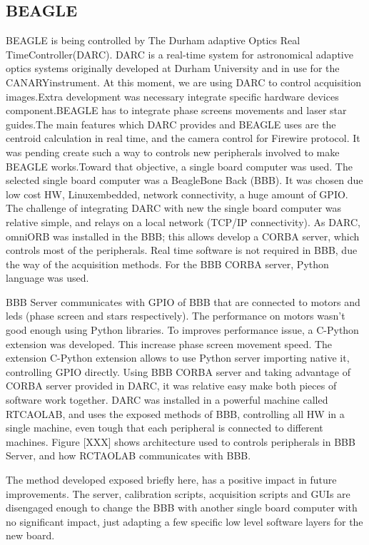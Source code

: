 \documentclass[]{spie}  %
\begin{document}
\subsection{BEAGLE}
BEAGLE is being controlled by The Durham adaptive Optics Real
TimeController(DARC). DARC is a real-time system for astronomical adaptive
optics systems originally developed at Durham University and in use for the
CANARYinstrument. At this moment, we are using DARC to control acquisition
images.Extra development was necessary integrate specific hardware devices
component.BEAGLE has to integrate phase screens movements and laser star
guides.The main features which DARC provides and BEAGLE uses are the centroid
calculation in real time, and the camera control for Firewire protocol. It was
pending create such a way to controls new peripherals involved to make BEAGLE
works.Toward that objective, a single board computer was used. The selected
single board computer was a BeagleBone Back (BBB). It was chosen due low cost
HW, Linuxembedded, network connectivity, a huge amount of GPIO. The challenge of
integrating DARC with new the single board computer was relative simple, and
relays on a local network (TCP/IP connectivity). As  DARC, omniORB was installed
in the BBB; this allows develop a CORBA server, which controls most of the
peripherals. Real time software is not required in BBB, due the way of the
acquisition methods.  For the BBB CORBA server, Python language was used.


  BBB Server communicates with GPIO of BBB that are connected to motors and
  leds (phase screen and stars respectively). The performance on motors  wasn't
  good enough using Python libraries. To improves performance issue, a  C-Python
  extension was developed. This increase phase screen movement speed.  The
  extension C-Python extension allows to use Python server importing native  it,
  controlling GPIO directly.
    Using BBB CORBA server and taking advantage of CORBA server provided in
    DARC,  it was relative easy make both pieces of software work together. DARC
    was  installed in a powerful machine called RTCAOLAB, and uses the exposed
    methods  of BBB, controlling all HW in a single machine, even tough that
    each  peripheral is connected to different machines.  Figure [XXX] shows
    architecture used to controls peripherals in BBB  Server, and how RCTAOLAB
    communicates with BBB.
      
    The method developed exposed briefly here, has a positive impact in future
    improvements. The server, calibration scripts, acquisition scripts and GUIs
    are disengaged enough to change the BBB with another single board computer
    with no significant impact, just adapting a few specific low level software
    layers for the new board.
\end{document}
